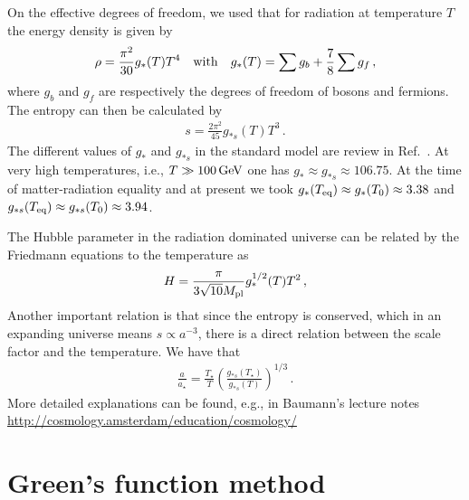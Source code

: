 \documentclass[a4paper,11pt]{article}
\numberwithin{equation}{section}
\begin{document}
On the effective degrees of freedom, we used that for radiation at temperature $T$ the energy density is given by
\begin{align}
\rho=\frac{\pi^2}{30}g_*(T)T^4\quad{\rm with}\quad g_*(T)=\sum g_b+\frac{7}{8}\sum g_f\,,
\end{align}
where $g_b$ and $g_f$ are respectively the degrees of freedom of bosons and fermions. The entropy can then be calculated by
\begin{align}
s=\frac{2\pi^2}{45}g_{*s}(T)T^3\,.
\end{align}
The different values of $g_{*}$ and $g_{*s}$ in the standard model are review in Ref.~\cite{Husdal:2016haj}. At very high temperatures, i.e., $T\gg 100\,{\rm GeV}$ one has $g_{*}\approx g_{*s}\approx 106.75$. At the time of matter-radiation equality and at present we took $g_*(T_{\rm eq})\approx g_{*}(T_{0})\approx 3.38$ and $g_{*s}(T_{\rm eq})\approx g_{*s}(T_{0})\approx 3.94$.

The Hubble parameter in the radiation dominated universe can be related by the Friedmann equations to the temperature as
\begin{align}
H=\frac{\pi}{3\sqrt{10}M_{\rm pl}}g_*^{1/2}(T)T^2\,,
\end{align}
Another important relation is that since the entropy is conserved, which in an expanding universe means $s\propto a^{-3}$, there is a direct relation between the scale factor and the temperature. We have that 
\begin{align}
\frac{a}{a_\star}=\frac{T_\star}{T}\left(\frac{g_{*s}(T_\star)}{g_{*s}(T)}\right)^{1/3}\,.
\end{align}
More detailed explanations can be found, e.g., in Baumann's lecture notes \url{http://cosmology.amsterdam/education/cosmology/}

\section{Green's function method \label{sec:green}}
\end{document}
